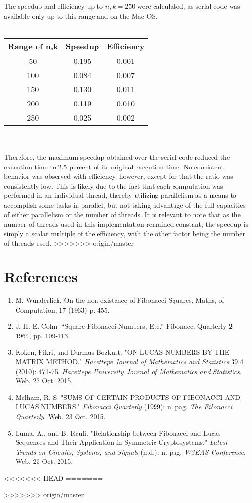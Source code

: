 \documentclass[11pt]{article}
\begin{document}
The speedup and efficiency up to $n,k=250$ were calculated, as serial code was available only up to this range and on the Mac OS.
\\ \\
\begin{tabular}{ccc}
\hline
 Range of n,k & Speedup  & Efficiency \\ \hline
50 & 0.195 & 0.001\\
100 & 0.084 & 0.007 \\
150 & 0.130 & 0.011 \\
200 & 0.119 & 0.010 \\
250 & 0.025 & 0.002 \\ 
 \hline \hline
\end{tabular} \\ \\
Therefore, the maximum speedup obtained over the serial code reduced the execution time to 2.5 percent of its original execution time. No consistent behavior was observed with efficiency, however, except for that the ratio was consistently low. This is likely due to the fact that each computation was performed in an individual thread, thereby utilizing parallelism as a means to accomplish some tasks in parallel, but not taking advantage of the full capacities of either parallelism or the number of threads. It is relevant to note that as the number of threads used in this implementation remained constant, the speedup is simply a scalar multiple of the efficiency, with the other factor being the number of threads used.
>>>>>>> origin/master

\section{References}

\begin{enumerate}
\item M. Wunderlich, On the non-existence of Fibonacci Squares, Maths, of Computation, 17 (1963) p. 455. 

\item J. H. E. Cohn, ``Square Fibonacci Numbers, Etc.'' Fibonacci Quarterly \textbf{2} 1964, pp. 109-113.

\item Koken, Fikri, and Durmus Bozkurt. "ON LUCAS NUMBERS BY THE MATRIX METHOD." \textit{Hacettepe Journal of Mathematics and Statistics} 39.4 (2010): 471-75. \textit{Hacettepe University Journal of Mathematics and Statistics}. Web. 23 Oct. 2015.

\item Melham, R. S. "SUMS OF CERTAIN PRODUCTS OF FIBONACCI AND LUCAS NUMBERS." \textit{Fibonacci Quarterly} (1999): n. pag. \textit{The Fibonacci Quarterly}. Web. 23 Oct. 2015.

\item Luma, A., and B. Raufi. "Relationship between Fibonacci and Lucas Sequences and Their Application in Symmetric Cryptosystems." \textit{Latest Trends on Circuits, Systems, and Signals} (n.d.): n. pag. \textit{WSEAS Conference}. Web. 23 Oct. 2015.
\end{enumerate}

<<<<<<< HEAD
=======


>>>>>>> origin/master
\end{document}
